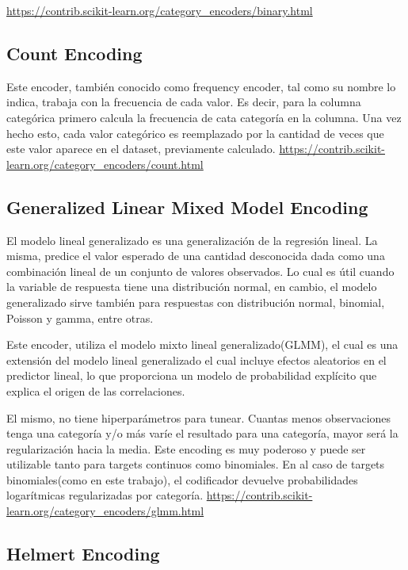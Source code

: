 \documentclass[12pt,a4paper]{article}
\begin{document}
\url{https://contrib.scikit-learn.org/category_encoders/binary.html}

\subsection{Count Encoding}
Este encoder, también conocido como frequency encoder, tal como su nombre lo indica, trabaja con la frecuencia de cada valor. Es decir, para la columna categórica primero calcula la frecuencia de cata categoría en la columna. Una vez hecho esto, cada valor categórico es reemplazado por la cantidad de veces que este valor aparece en el dataset, previamente calculado.
\url{https://contrib.scikit-learn.org/category_encoders/count.html}

\subsection{Generalized Linear Mixed Model Encoding}

El modelo lineal generalizado es una generalización de la regresión lineal. La misma, predice el valor esperado de una cantidad desconocida dada como una combinación lineal de un conjunto de valores observados. Lo cual es útil cuando la variable de respuesta tiene una distribución normal, en cambio, el modelo generalizado sirve también para respuestas con distribución normal, binomial, Poisson y gamma, entre otras. \newline

Este encoder, utiliza el modelo mixto lineal generalizado(GLMM), el cual es una extensión del modelo lineal generalizado el cual incluye efectos aleatorios en el predictor lineal, lo que proporciona un modelo de probabilidad explícito que explica el origen de las correlaciones.\newline

El mismo, no tiene hiperparámetros para tunear. Cuantas menos observaciones tenga una categoría y/o más varíe el resultado para una categoría, mayor será la regularización hacia la media. Este encoding es muy poderoso y puede ser utilizable tanto para targets continuos como binomiales. En al caso de targets binomiales(como en este trabajo), el codificador devuelve probabilidades logarítmicas regularizadas por categoría.
\url{https://contrib.scikit-learn.org/category_encoders/glmm.html}

\subsection{Helmert Encoding}
\end{document}
